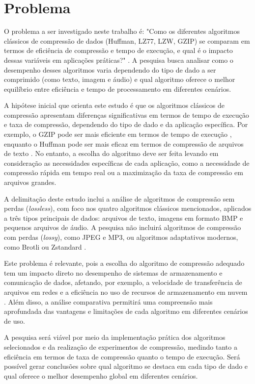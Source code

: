 \chapter{Problema}
\label{c.problema}

O problema a ser investigado neste trabalho é: "Como os diferentes algoritmos clássicos de compressão de dados (Huffman, LZ77, LZW, GZIP) se comparam em termos de eficiência de compressão e tempo de execução, e qual é o impacto dessas variáveis em aplicações práticas?" \cite{salomon2007data}. A pesquisa busca analisar como o desempenho desses algoritmos varia dependendo do tipo de dado a ser comprimido (como texto, imagem e áudio) e qual algoritmo oferece o melhor equilíbrio entre eficiência e tempo de processamento em diferentes cenários.

A hipótese inicial que orienta este estudo é que os algoritmos clássicos de compressão apresentam diferenças significativas em termos de tempo de execução e taxa de compressão, dependendo do tipo de dado e da aplicação específica. Por exemplo, o GZIP pode ser mais eficiente em termos de tempo de execução \cite{deutsch1996gzip}, enquanto o Huffman pode ser mais eficaz em termos de compressão de arquivos de texto \cite{salomon2007data}. No entanto, a escolha do algoritmo deve ser feita levando em consideração as necessidades específicas de cada aplicação, como a necessidade de compressão rápida em tempo real ou a maximização da taxa de compressão em arquivos grandes.

A delimitação deste estudo inclui a análise de algoritmos de compressão sem perdas (\textit{lossless}), com foco nos quatro
algoritmos clássicos mencionados, aplicados a três tipos principais de dados: arquivos de texto, imagens em formato BMP 
e pequenos arquivos de áudio. A pesquisa não incluirá algoritmos de compressão com perdas (\textit{lossy}), como JPEG e MP3, ou algoritmos adaptativos modernos, como Brotli \cite{alakuijala2016brotli} ou Zstandard \cite{collet2016zstandard}.

Este problema é relevante, pois a escolha do algoritmo de compressão adequado tem um impacto direto no desempenho de sistemas de armazenamento e comunicação de dados, afetando, por exemplo, a velocidade de transferência de arquivos em redes e a eficiência no uso de recursos de armazenamento em nuvem \cite{deutsch1996gzip}. Além disso, a análise comparativa permitirá uma compreensão mais aprofundada das vantagens e limitações de cada algoritmo em diferentes cenários de uso.

A pesquisa será viável por meio da implementação prática dos algoritmos selecionados e da realização de experimentos de compressão, medindo tanto a eficiência em termos de taxa de compressão quanto o tempo de execução. Será possível gerar conclusões sobre qual algoritmo se destaca em cada tipo de dado e qual oferece o melhor desempenho global em diferentes cenários.

